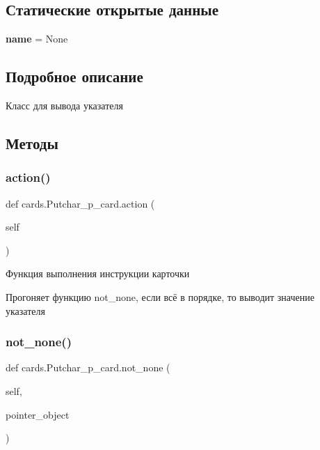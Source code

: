 \subsection*{Статические открытые данные}
\begin{DoxyCompactItemize}
\item 
\mbox{\label{classcards_1_1_putchar__p__card_aed6e2a99cdb9becf4d1f308f0761b175}} 
{\bfseries name} = None
\end{DoxyCompactItemize}


\subsection{Подробное описание}
Класс для вывода указателя 



\subsection{Методы}
\mbox{\label{classcards_1_1_putchar__p__card_ac61d82b3ee96f92a953877e3b0b9d692}} 
\subsubsection{\texorpdfstring{action()}{action()}}
{\footnotesize\ttfamily def cards.\+Putchar\+\_\+p\+\_\+card.\+action (\begin{DoxyParamCaption}\item[{}]{self }\end{DoxyParamCaption})}



Функция выполнения инструкции карточки 

Прогоняет функцию not\+\_\+none, если всё в порядке, то выводит значение указателя \mbox{\label{classcards_1_1_putchar__p__card_a5243088f07d00a7cafabdc2240ca7f23}} 
\subsubsection{\texorpdfstring{not\_none()}{not\_none()}}
{\footnotesize\ttfamily def cards.\+Putchar\+\_\+p\+\_\+card.\+not\+\_\+none (\begin{DoxyParamCaption}\item[{}]{self,  }\item[{}]{pointer\+\_\+object }\end{DoxyParamCaption})}



